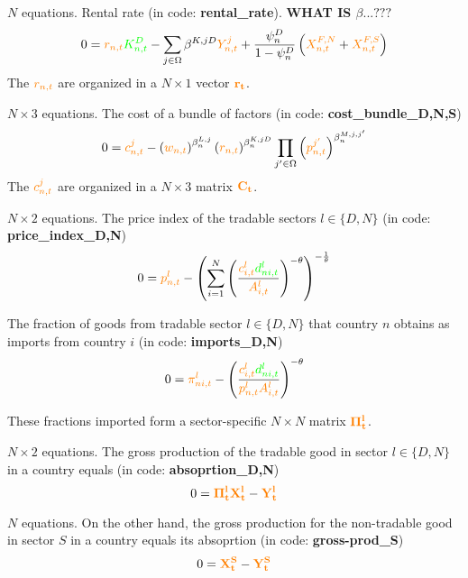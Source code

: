\documentclass[12pt, bibtotoc, tablecaptionabove, figurecaptionabove, fleqn]{article}
\newcommand{\cl}[1]{{\color{orange}{#1}}}
\newcommand{\st}[1]{{\color{green}{#1}}}
\begin{document}
\noindent $N$ equations. Rental rate  (in code: {\bf{rental\_rate}}). {\bf{WHAT IS $\beta ...???$}}
\begin{equation}
  0 = \cl{r_{n, t}} \st{K_{n, t}^{D}}-\sum_{j \in \Omega} \beta^{K, j D} \cl{Y_{n, t}^{j}}+\frac{\psi^{D}_n} { 1-\psi^D_n }\left(\cl{X_{n, t}^{F, N}}+\cl{X_{n, t}^{F, S}}\right)
\end{equation}
The $\cl{r_{n,t}}$ are organized in a $ N \times 1$ vector $\mathbf{\cl{r_t}}$.

\noindent $N \times 3$ equations. The cost of a bundle of factors (in code: {\bf{cost\_bundle\_D,N,S}})
\begin{equation}
0 = \cl{c_{n, t}^{j}}-\left(\cl{w_{n, t}}\right)^{\beta_{n}^{L, j}}\left(\cl{r_{n, t}}\right)^{\beta_{n}^{K, j D}} \prod_{j^{\prime} \in \Omega}\left(\cl{p_{n, t}^{j^{\prime}}}\right)^{\beta_{n}^{M, j,j^{\prime}}}
\end{equation}
The $\cl{c^j_{n,t}}$ are organized in a $ N \times 3$ matrix $\mathbf{\cl{C_t}}$.


\noindent $N \times 2$ equations. The price index of the tradable sectors $l \in \{D,N\}$ (in code: {\bf{price\_index\_D,N}})
\begin{equation}
0 = \cl{p^l_{n,t}} - \left(\sum^{N}_{i=1} \left( \frac{\cl{c^l_{i,t}} \st{d^l_{ni,t}}}{\cl{A_{i,t}^l}} \right)^{-\theta} \right)^{-\frac{1}{\theta}}
\end{equation}

The fraction of goods from tradable sector $l \in \{D,N\}$ that country $n$ obtains as imports from country $i$ (in code: {\bf{imports\_D,N}})
\begin{equation}
0 = \cl{\pi^l_{ni,t}} - \left( \frac{\cl{c^l_{i,t}} \st{d^l_{ni,t}}}{\cl{p_{n,t}^l} \cl{A_{i,t}^l}} \right)^{-\theta}
\end{equation}


These fractions imported form a sector-specific $N \times N$ matrix $\mathbf{\cl{\Pi_t^l}}$.

\noindent $N \times 2$ equations. The gross production of the tradable good in sector $l \in \{D,N\}$ in a country equals (in code: {\bf{absoprtion\_D,N}})
\begin{equation}
0 = \mathbf{\cl{\Pi^l_t}}\mathbf{\cl{X^l_t}} -  \mathbf{\cl{Y^l_t}}
\end{equation}

\noindent $N$ equations. On the other hand, the gross production for the non-tradable good in sector $S$ in a country equals its absoprtion (in code: {\bf{gross-prod\_S}})
\begin{equation}
0 = \mathbf{\cl{X^S_t}} -  \mathbf{\cl{Y^S_t}}
\end{equation}
\end{document}

